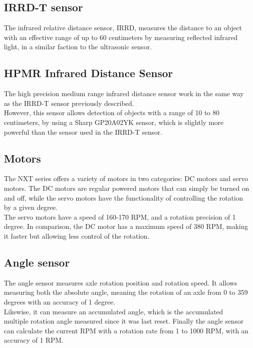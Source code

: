 \subsection{IRRD-T sensor}
The infrared relative distance sensor, IRRD, measures the distance to an object with an effective range of up to 60 centimeters by measuring reflected infrared light, in a similar faction to the ultrasonic sensor.

\subsection{HPMR Infrared Distance Sensor}
The high precision medium range infrared distance sensor work in the same way as the IRRD-T sensor previously described.\\
However, this sensor allows detection of objects with a range of 10 to 80 centimeters, by using a Sharp GP20A02YK sensor, which is slightly more powerful than the sensor used in the IRRD-T sensor.

\subsection{Motors}
The NXT series offers a variety of motors in two categories: DC motors and servo motors.
The DC motors are regular powered motors that can simply be turned on and off, while the servo motors have the functionality of controlling the rotation by a given degree.\\
The servo motors have a speed of 160-170 RPM, and a rotation precision of 1 degree.
In comparison, the DC motor has a maximum speed of 380 RPM, making it faster but allowing less control of the rotation.

\subsection{Angle sensor}
The angle sensor measures axle rotation position and rotation speed. 
It allows measuring both the absolute angle, meaning the rotation of an axle from 0 to 359 degrees with an accuracy of 1 degree.\\
Likewise, it can measure an accumulated angle, which is the accumulated multiple rotation angle measured since it was last reset.
Finally the angle sensor can calculate the current RPM with a rotation rate from 1 to 1000 RPM, with an accuracy of 1 RPM.